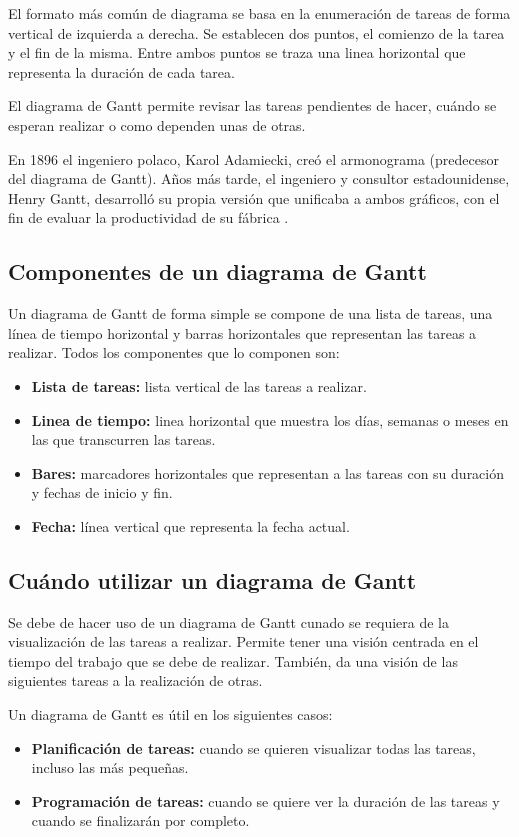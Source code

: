 El formato más común de diagrama se basa en la enumeración de tareas de forma vertical de izquierda a derecha. Se establecen dos puntos, el comienzo de la tarea y el fin de la misma. Entre ambos puntos se traza una linea horizontal que representa la duración de cada tarea.

El diagrama de Gantt permite revisar las tareas pendientes de hacer, cuándo se esperan realizar o como dependen unas de otras.

En 1896 el ingeniero polaco, Karol Adamiecki, creó el armonograma (predecesor del diagrama de Gantt). Años más tarde, el ingeniero y consultor estadounidense, Henry Gantt, desarrolló su propia versión que unificaba a ambos gráficos, con el fin de evaluar la productividad de su fábrica \cite{gantt_wikipedia}.

\subsection{Componentes de un diagrama de Gantt}
Un diagrama de Gantt de forma simple se compone de una lista de tareas, una línea de tiempo horizontal y barras horizontales que representan las tareas a realizar. Todos los componentes que lo componen son:

\begin{itemize}
    \item \textbf{Lista de tareas:} lista vertical de las tareas a realizar.
    \item \textbf{Linea de tiempo:} linea horizontal que muestra los días, semanas o meses en las que transcurren las tareas.
    \item \textbf{Bares:} marcadores horizontales que representan a las tareas con su duración y fechas de inicio y fin.
    \item \textbf{Fecha:} línea vertical que representa la fecha actual.
\end{itemize}

\subsection{Cuándo utilizar un diagrama de Gantt}
Se debe de hacer uso de un diagrama de Gantt cunado se requiera de la visualización de las tareas a realizar. Permite tener una visión centrada en el tiempo del trabajo que se debe de realizar. También, da una visión de las siguientes tareas a la realización de otras.

Un diagrama de Gantt es útil en los siguientes casos:
\begin{itemize}
    \item \textbf{Planificación de tareas:} cuando se quieren visualizar todas las tareas, incluso las más pequeñas.
    \item \textbf{Programación de tareas:} cuando se quiere ver la duración de las tareas y cuando se finalizarán por completo.
\end{itemize}

